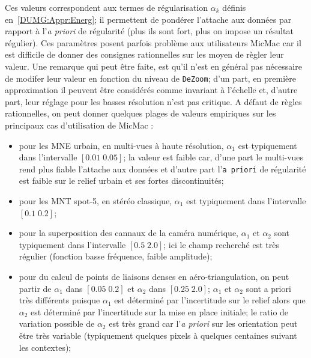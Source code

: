 Ces valeurs correspondent aux termes de r\'egularisation
$\alpha_k$  d\'efinis en~\ref{DUMG:Appr:Energ};  il permettent
de pond\'erer l'attache aux donn\'ees par rapport \`a l'\emph{a priori}
de r\'egularit\'e (plus ils sont fort, plus on impose un r\'esultat
r\'egulier).
Ces param\`etres posent parfois probl\`eme aux utilisateurs
MicMac car il est difficile de donner  des  consignes rationnelles
sur les moyen de r\`egler leur valeur. Une  remarque
qui peut \^etre faite, est qu'il n'est en g\'en\'eral pas
n\'ecessaire de modifer leur valeur en fonction du niveau
de {\tt DeZoom}; d'un part, en premi\`ere approximation il
peuvent \^etre consid\'er\'es comme invariant \`a l'\'echelle et,
d'autre part, leur r\'eglage pour les basses r\'esolution n'est
pas critique. A d\'efaut de r\`egles rationnelles, on peut
donner quelques plages de valeurs empiriques sur les principaux
cas d'utilisation de MicMac :


\begin{itemize}
    \item pour les MNE urbain, en multi-vues \`a haute r\'esolution,
          $\alpha_1$ est typiquement dans l'intervalle $[0.01 \; 0.05]$;
          la valeur est faible car, d'une part le multi-vues rend plus
          fiable l'attache aux donn\'ees et d'autre part l'{\tt a priori}
          de r\'egularit\'e est faible sur
          le relief urbain et  ses fortes discontinuit\'es;

    \item pour les MNT spot-5, en st\'er\'eo classique,
           $\alpha_1$ est typiquement dans l'intervalle $[0.1 \; 0.2]$;

    \item pour la superposition des cannaux de la cam\'era num\'erique,
           $\alpha_1$ et  $\alpha_2$ sont typiquement dans l'intervalle
           $[0.5 \; 2.0]$; ici le champ recherch\'e est tr\`es
           r\'egulier (fonction basse fr\'equence, faible amplitude);

    \item pour du calcul de points de liaisons denses en a\'ero-triangulation,
          on peut partir de  $\alpha_1$ dans $[0.05 \; 0.2]$ et $\alpha_2$
          dans $[0.25 \; 2.0]$; $\alpha_1$ et  $\alpha_2$ sont a priori
          tr\`es diff\'erents puisque  $\alpha_1$ est d\'etermin\'e par
          l'incertitude sur le relief alors que $\alpha_2$ est d\'etermin\'e
          par l'incertitude sur la mise en place initiale; le ratio
          de variation possible de $\alpha_2$ est tr\`es grand car
          l'\emph{a priori} sur les orientation peut \^etre tr\`es
          variable (typiquement quelques pixels \`a quelques centaines
          suivant les contextes);

\end{itemize}

